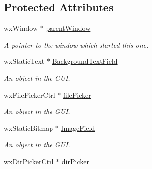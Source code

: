 \subsection*{Protected Attributes}
\begin{DoxyCompactItemize}
\item 
\hypertarget{classGUIFrame_a18697cb459c5894c96a64386740254ff}{
wxWindow $\ast$ \hyperlink{classGUIFrame_a18697cb459c5894c96a64386740254ff}{parentWindow}}
\label{classGUIFrame_a18697cb459c5894c96a64386740254ff}

\begin{DoxyCompactList}\small\item\em A pointer to the window which started this one. \item\end{DoxyCompactList}\item 
\hypertarget{classGUIFrame_afcc8c6e1bd170ae39f0d2f32bdb49def}{
wxStaticText $\ast$ \hyperlink{classGUIFrame_afcc8c6e1bd170ae39f0d2f32bdb49def}{BackgroundTextField}}
\label{classGUIFrame_afcc8c6e1bd170ae39f0d2f32bdb49def}

\begin{DoxyCompactList}\small\item\em An object in the GUI. \item\end{DoxyCompactList}\item 
\hypertarget{classGUIFrame_a68092597dcdf26e08ccc9534274e9a46}{
wxFilePickerCtrl $\ast$ \hyperlink{classGUIFrame_a68092597dcdf26e08ccc9534274e9a46}{filePicker}}
\label{classGUIFrame_a68092597dcdf26e08ccc9534274e9a46}

\begin{DoxyCompactList}\small\item\em An object in the GUI. \item\end{DoxyCompactList}\item 
\hypertarget{classGUIFrame_a22d96933dfeef175c02bfe621a72ac63}{
wxStaticBitmap $\ast$ \hyperlink{classGUIFrame_a22d96933dfeef175c02bfe621a72ac63}{ImageField}}
\label{classGUIFrame_a22d96933dfeef175c02bfe621a72ac63}

\begin{DoxyCompactList}\small\item\em An object in the GUI. \item\end{DoxyCompactList}\item 
\hypertarget{classGUIFrame_ab4953f65e0a54f350792baf889db9939}{
wxDirPickerCtrl $\ast$ \hyperlink{classGUIFrame_ab4953f65e0a54f350792baf889db9939}{dirPicker}}
\label{classGUIFrame_ab4953f65e0a54f350792baf889db9939}


\end{DoxyCompactItemize}
